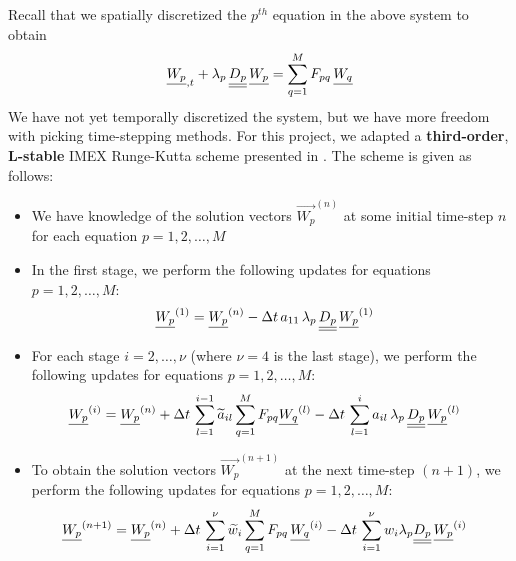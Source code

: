 Recall that we spatially discretized the $p^{th}$ equation in the above system to obtain
\begin{align}
    {\underline{W_{p}}}_{, t} + \lambda_{p} \, {\underline{\underline{D_{p}}}} \, {\underline{W_{p}}} = \sum_{q=1}^{M} F_{pq} \, {\underline{W_{q}}}
\end{align}
We have not yet temporally discretized the system, but we have more freedom with picking time-stepping methods.
For this project, we adapted a \textbf{third-order}, \textbf{L-stable} IMEX Runge-Kutta scheme presented in \cite{PieracciniPuppo:3}.
The scheme is given as follows:
\begin{itemize}
    \item We have knowledge of the solution vectors $\vec{W_{p}}^{(n)}$ at some initial time-step $n$ for each equation $p = 1, 2, \hdots, M$
    \item In the first stage, we perform the following updates for equations $p = 1, 2, \hdots, M$:
    \begin{align}
        {\underline{W_{p}}}^{(1)} & = {\underline{W_{p}}}^{(n)} - \Delta t \, a_{11} \, \lambda_{p} \, {\underline{\underline{D_{p}}}} \, {\underline{W_{p}}}^{(1)} \label{time_stepping:line_1}
    \end{align}
    \item For each stage $i = 2, \hdots, \nu$ (where $\nu = 4$ is the last stage), we perform the following updates for equations $p = 1, 2, \hdots, M$:
    \begin{align}
        {\underline{W_{p}}}^{(i)} & = {\underline{W_{p}}}^{(n)} + \Delta t \, \sum_{l=1}^{i-1} \widetilde{a}_{il} \sum_{q=1}^{M} F_{pq} {\underline{W_{q}}}^{(l)} - \Delta t \, \sum_{l=1}^{i} a_{il} \, \lambda_{p} \, {\underline{\underline{D_{p}}}} \, {\underline{W_{p}}}^{(l)} \label{time_stepping:line_2}
    \end{align}
    \item To obtain the solution vectors $\vec{W_{p}}^{(n+1)}$ at the next time-step $(n+1)$, we perform the following updates for equations $p = 1, 2, \hdots, M$:
    \begin{align}
        {\underline{W_{p}}}^{(n+1)} & = {\underline{W_{p}}}^{(n)} + \Delta t \, \sum_{i=1}^{\nu} \widetilde{w}_{i} \sum_{q=1}^{M} F_{pq} \, {\underline{W_{q}}}^{(i)} - \Delta t \, \sum_{i=1}^{\nu} w_{i} \lambda_{p} {\underline{\underline{D_{p}}}} \, {\underline{W_{p}}}^{(i)} \label{time_stepping:line_3}
    \end{align}
\end{itemize}
